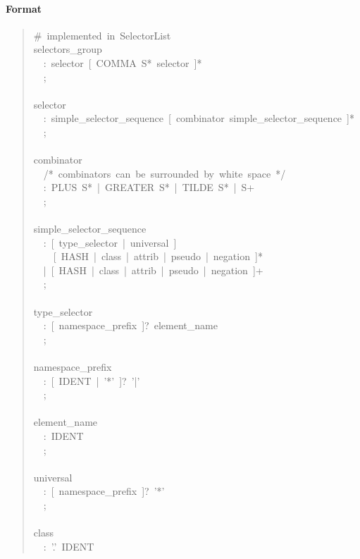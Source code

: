 \paragraph*{Format}
\label{format}
\begin{quote}{\ttfamily \raggedright \noindent
{\#}~implemented~in~SelectorList~\\
selectors{\_}group~\\
~~:~selector~{[}~COMMA~S*~selector~{]}*~\\
~~;~\\
~\\
selector~\\
~~:~simple{\_}selector{\_}sequence~{[}~combinator~simple{\_}selector{\_}sequence~{]}*~\\
~~;~\\
~\\
combinator~\\
~~/*~combinators~can~be~surrounded~by~white~space~*/~\\
~~:~PLUS~S*~|~GREATER~S*~|~TILDE~S*~|~S+~\\
~~;~\\
~\\
simple{\_}selector{\_}sequence~\\
~~:~{[}~type{\_}selector~|~universal~{]}~\\
~~~~{[}~HASH~|~class~|~attrib~|~pseudo~|~negation~{]}*~\\
~~|~{[}~HASH~|~class~|~attrib~|~pseudo~|~negation~{]}+~\\
~~;~\\
~\\
type{\_}selector~\\
~~:~{[}~namespace{\_}prefix~{]}?~element{\_}name~\\
~~;~\\
~\\
namespace{\_}prefix~\\
~~:~{[}~IDENT~|~'*'~{]}?~'|'~\\
~~;~\\
~\\
element{\_}name~\\
~~:~IDENT~\\
~~;~\\
~\\
universal~\\
~~:~{[}~namespace{\_}prefix~{]}?~'*'~\\
~~;~\\
~\\
class~\\
~~:~'.'~IDENT~\\
}
\end{quote}
